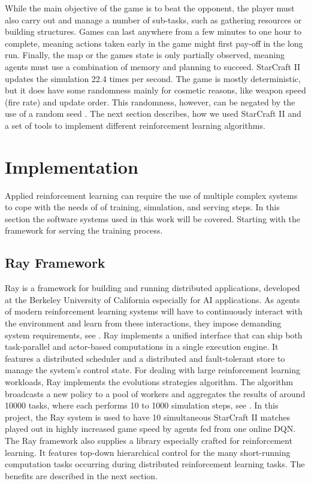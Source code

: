 \documentclass[12pt,a4paper]{article}
\begin{document}
While the main objective of the game is to beat the opponent, the player must also carry out and manage a number of sub-tasks, such as gathering resources or building structures. Games can last anywhere from a few minutes to one hour to complete, meaning actions taken early in the game might first pay-off in the long run. Finally, the map or the games state is only partially observed, meaning agents must use a combination of memory and planning to succeed.
StarCraft II updates the simulation 22.4 times per second. The game is mostly deterministic, but it does have some randomness mainly for cosmetic reasons, like weapon speed (fire rate) and update order. This randomness, however, can be negated by the use of a random seed \cite{DBLP:journals/corr/abs-1708-04782}.
The next section describes, how we used StarCraft II and a set of tools to implement different reinforcement learning algorithms.
\section{Implementation}
Applied reinforcement learning can require the use of multiple complex systems to cope with the needs of of training, simulation, and serving steps. In this section the software systems used in this work will be covered. Starting with the framework for serving the training process.
\subsection{Ray Framework}
Ray is a framework for building and running distributed applications, developed at the Berkeley University of California especially for AI applications. As agents of modern reinforcement learning systems will have to continuously interact with the environment and learn from these interactions, they impose demanding system requirements, see \cite{Moritz2017}. Ray implements a unified interface that can ship both task-parallel and actor-based computations in a single execution engine.
It features a distributed scheduler and a distributed and fault-tolerant store to manage the system's control state.
For dealing with large reinforcement learning workloads, Ray implements the evolutions strategies algorithm. The algorithm broadcasts a new policy to a pool of workers and aggregates the results of around 10000 tasks, where each performs 10 to 1000 simulation steps, see \cite{Moritz2017}.
In this project, the Ray system is used to have 10 simultaneous StarCraft II matches played out in highly increased game speed by agents fed from one online DQN.
The Ray framework also supplies a library especially crafted for reinforcement learning. It features top-down hierarchical control for the many short-running computation tasks occurring during distributed reinforcement learning tasks. The benefits are described in the next section.
\end{document}
